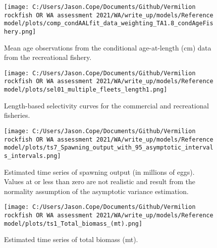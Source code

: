 \documentclass[11pt,
  english,
  a4paper,
]{article}
\begin{document}
\begin{figure}
\centering
\texttt{[image: C:/Users/Jason.Cope/Documents/Github/Vermilion rockfish OR WA assessment 2021/WA/write\_up/models/Reference model/plots/comp\_condAALfit\_data\_weighting\_TA1.8\_condAgeFishery.png]}
\caption{Mean age observations from the conditional age-at-length (cm) data from the recreational fishery.\label{fig:rec-mean-caal}}
\end{figure}

\tagmcend\tagstructend


\begin{figure}
\centering
\texttt{[image: C:/Users/Jason.Cope/Documents/Github/Vermilion rockfish OR WA assessment 2021/WA/write\_up/models/Reference model/plots/sel01\_multiple\_fleets\_length1.png]}
\caption{Length-based selectivity curves for the commercial and recreational fisheries.\label{fig:fleet_selectivity}}
\end{figure}

\tagmcend\tagstructend


\begin{figure}
\centering
\texttt{[image: C:/Users/Jason.Cope/Documents/Github/Vermilion rockfish OR WA assessment 2021/WA/write\_up/models/Reference model/plots/ts7\_Spawning\_output\_with\_95\_asymptotic\_intervals\_intervals.png]}
\caption{Estimated time series of spawning output (in millions of eggs). Values at or less than zero are not realistic and result from the normality assumption of the asymptotic variance estimation.\label{fig:ssb}}
\end{figure}

\tagmcend\tagstructend


\begin{figure}
\centering
\texttt{[image: C:/Users/Jason.Cope/Documents/Github/Vermilion rockfish OR WA assessment 2021/WA/write\_up/models/Reference model/plots/ts1\_Total\_biomass\_(mt).png]}
\caption{Estimated time series of total biomass (mt).\label{fig:tot-bio}}
\end{figure}
\end{document}
